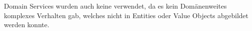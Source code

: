 
Domain Services wurden auch keine verwendet, da es kein Domänenweites komplexes Verhalten gab, welches nicht in Entities oder Value Objects abgebildet werden konnte.










